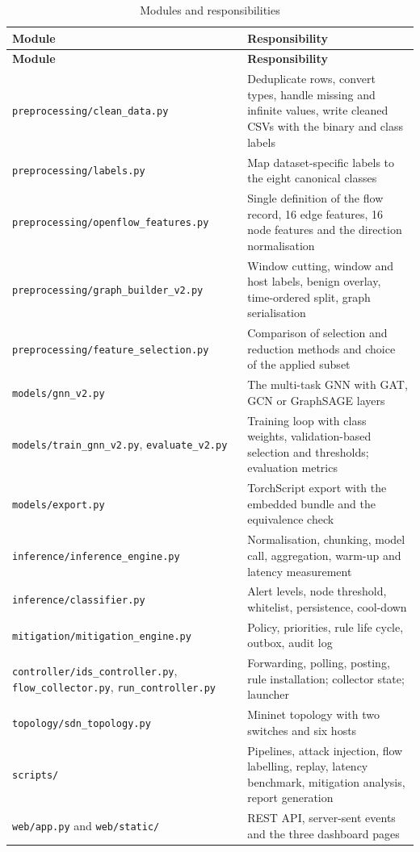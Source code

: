 \begin{longtable}{|p{4.6cm}|p{9.4cm}|}
\caption{Modules and responsibilities}\label{tab:modules}\\
\hline
\textbf{Module} & \textbf{Responsibility} \\ \hline
\endfirsthead
\hline \textbf{Module} & \textbf{Responsibility} \\ \hline
\endhead
\texttt{preprocessing/clean\_data.py} & Deduplicate rows, convert types, handle missing and infinite values, write cleaned CSVs with the binary and class labels \\ \hline
\texttt{preprocessing/labels.py} & Map dataset-specific labels to the eight canonical classes \\ \hline
\texttt{preprocessing/openflow\_features.py} & Single definition of the flow record, 16 edge features, 16 node features and the direction normalisation \\ \hline
\texttt{preprocessing/graph\_builder\_v2.py} & Window cutting, window and host labels, benign overlay, time-ordered split, graph serialisation \\ \hline
\texttt{preprocessing/feature\_selection.py} & Comparison of selection and reduction methods and choice of the applied subset \\ \hline
\texttt{models/gnn\_v2.py} & The multi-task GNN with GAT, GCN or GraphSAGE layers \\ \hline
\texttt{models/train\_gnn\_v2.py}, \texttt{evaluate\_v2.py} & Training loop with class weights, validation-based selection and thresholds; evaluation metrics \\ \hline
\texttt{models/export.py} & TorchScript export with the embedded bundle and the equivalence check \\ \hline
\texttt{inference/inference\_engine.py} & Normalisation, chunking, model call, aggregation, warm-up and latency measurement \\ \hline
\texttt{inference/classifier.py} & Alert levels, node threshold, whitelist, persistence, cool-down \\ \hline
\texttt{mitigation/mitigation\_engine.py} & Policy, priorities, rule life cycle, outbox, audit log \\ \hline
\texttt{controller/ids\_controller.py}, \texttt{flow\_collector.py}, \texttt{run\_controller.py} & Forwarding, polling, posting, rule installation; collector state; launcher \\ \hline
\texttt{topology/sdn\_topology.py} & Mininet topology with two switches and six hosts \\ \hline
\texttt{scripts/} & Pipelines, attack injection, flow labelling, replay, latency benchmark, mitigation analysis, report generation \\ \hline
\texttt{web/app.py} and \texttt{web/static/} & REST API, server-sent events and the three dashboard pages \\ \hline
\end{longtable}

